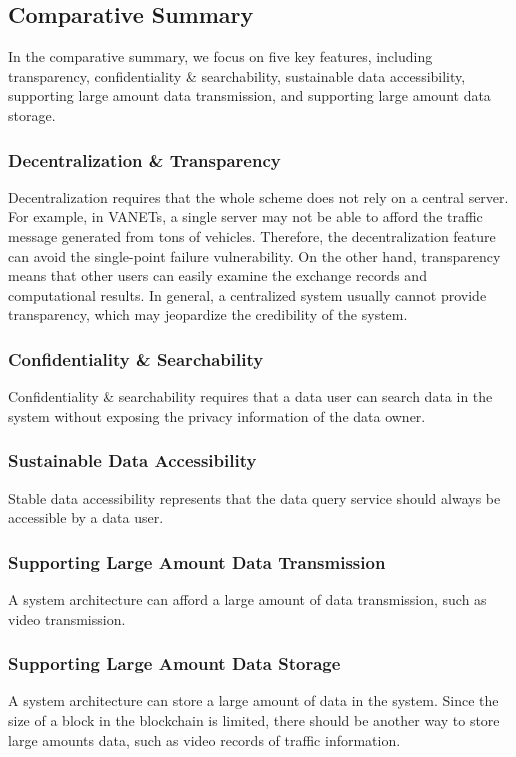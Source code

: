 \documentclass[journal,10pt]{IEEEtran}
\begin{document}
\subsection{Comparative Summary}
 In the comparative summary, we focus on five key features, including transparency, confidentiality \& searchability, sustainable data accessibility, supporting large amount data transmission, and supporting large amount data storage.
 
\subsubsection{Decentralization \& Transparency}
Decentralization requires that the whole scheme does not rely on a central server. For example, in VANETs, a single server may not be able to afford the traffic message generated from tons of vehicles. Therefore, the decentralization feature can avoid the single-point failure vulnerability. On the other hand, transparency means that
other users can easily examine the exchange records and computational results. In general, a centralized system usually cannot provide transparency, which may jeopardize the credibility of the system. 


\subsubsection{Confidentiality \& Searchability}
Confidentiality \& searchability requires that a data user can search data in the system without exposing the privacy information of the data owner.
  
\subsubsection{Sustainable Data Accessibility}
Stable data accessibility represents that the data query service should always be accessible by a data user.
  
\subsubsection{Supporting Large Amount Data Transmission}
A system architecture can afford a large amount of data transmission, such as video transmission.
  
\subsubsection{Supporting Large Amount Data Storage}
A system architecture can store a large amount of data in the system. Since the size of a block in the blockchain is limited, there should be another way to store large amounts data, such as video records of traffic information.
\end{document}
